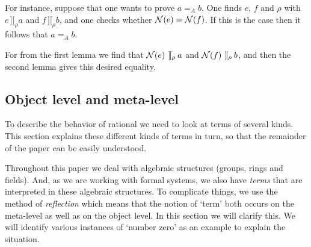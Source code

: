 \documentclass{article}
\newcommand{\intII}{\,]\![}
\newcommand{\intrel}{\mathbin{\intII_{\rho}}}
\newcommand{\N}{{\cal N}}
\newcommand{\tacticname}[1]{\textsf{#1}}
\newcommand{\rational}{\tacticname{rational}}
\begin{document}
For instance, suppose that one wants to prove $a =_A b$.
One finds $e$, $f$ and $\rho$ with $e \intrel a$ and $f \intrel b$,
and one checks whether $\N(e) = \N(f)$.
If this is the case then it follows that $a =_A b$.

For from the first lemma we find that $\N(e) \intrel a$ and $\N(f) \intrel b$,
and then the second lemma gives this desired equality.


\subsection{Object level and meta-level}\label{levels}

To describe the behavior of {\rational} we need to look at terms of
several kinds.
This section explains these different kinds of terms in turn,
so that the remainder of the paper can be easily understood.

Throughout this paper we deal with algebraic structures (groups, rings
and fields).
And, as we are working with formal systems, we also have
\emph{terms} that are interpreted in these algebraic structures.
To complicate things, we use the method of \emph{reflection}
which means that the notion of `term' both occurs on
the meta-level as well as on the object level.
In this section we will clarify this.
We will identify various instances of `number zero' as an example to explain
the situation.
\end{document}
